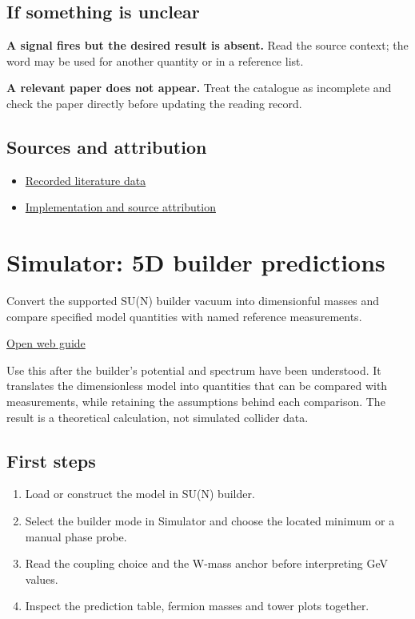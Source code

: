 \documentclass[11pt,a4paper]{article}
\begin{document}
\subsection*{If something is unclear}
\textbf{A signal fires but the desired result is absent.} Read the source context; the word may be used for another quantity or in a reference list.

\textbf{A relevant paper does not appear.} Treat the catalogue as incomplete and check the paper directly before updating the reading record.

\subsection*{Sources and attribution}
\begin{itemize}
\item \href{https://github.com/karlesmarin/ghu-lab/blob/main/data/census.json}{Recorded literature data}
\item \href{https://github.com/karlesmarin/ghu-lab/blob/main/src/sections/census_lit_section.js}{Implementation and source attribution}
\end{itemize}
\section{Simulator: 5D builder predictions}
Convert the supported SU(N) builder vacuum into dimensionful masses and compare specified model quantities with named reference measurements.

\href{https://karlesmarin.github.io/ghu-explorer/guide/simulator-builder/index.html}{Open web guide}

Use this after the builder's potential and spectrum have been understood. It translates the dimensionless model into quantities that can be compared with measurements, while retaining the assumptions behind each comparison. The result is a theoretical calculation, not simulated collider data.
\subsection*{First steps}
\begin{enumerate}
\item Load or construct the model in SU(N) builder.
\item Select the builder mode in Simulator and choose the located minimum or a manual phase probe.
\item Read the coupling choice and the W-mass anchor before interpreting GeV values.
\item Inspect the prediction table, fermion masses and tower plots together.
\end{enumerate}
\end{document}
